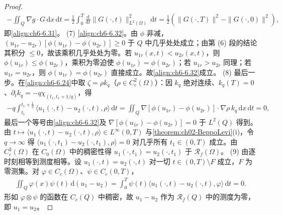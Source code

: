 \documentclass[../../main.tex]{subfiles}%
\begin{document}
\begin{proof}
\begin{align*}
-\iint_Q\nabla g\cdot G\,\mathrm{d}x\,\mathrm{d}t=\frac{1}{2}\int_0^T\frac{\mathrm{d}}{\mathrm{d}t}\|G(\cdot,t)\|_{L^2(\Omega)}^2\,\mathrm{d}t
=\frac{1}{2}\left(\|G(\cdot,T)\|^2-\|G(\cdot,0)\|^2\right),
\end{align*}
即\eqref{align:ch6-6.31}。
(7) \eqref{align:ch6-6.32}。由 $\phi$ 非减，$(u_{1r}-u_{2r})[\phi(u_{1r})-\phi(u_{2r})]\geqslant0$ 于 $Q$ 中几乎处处成立；由第 (6) 段的结论其积分 $\leqslant0$，故该乘积几乎处处为零。若 $u_{1r}(x,t)<u_{2r}(x,t)$，则 $\phi(u_{1r})\leqslant\phi(u_{2r})$，乘积为零迫使 $\phi(u_{1r})=\phi(u_{2r})$；若 $u_{1r}>u_{2r}$ 同理；若 $u_{1r}=u_{2r}$，则 $\phi(u_{1r})=\phi(u_{2r})$ 直接成立。故\eqref{align:ch6-6.32}成立。
(8) 最后一步。在\eqref{align:ch6-6.24}中取 $\zeta=\rho k_q$（$\rho\in C^2_c(\Omega)$）：因 $k_q$ 绝对连续、$k_q(T)=0$、$\partial_tk_q=-q\chi_{(t_1,t_1+1/q)}$，得
\begin{align*}
-q\int_{t_1}^{t_1+\frac{1}{q}}\langle u_1(\cdot,t)-u_2(\cdot,t),\rho\rangle\,\mathrm{d}t
=\iint_Q\nabla[\phi(u_{1r})-\phi(u_{2r})]\cdot\nabla\rho\,k_q\,\mathrm{d}x\,\mathrm{d}t=0,
\end{align*}
最后一个等号由\eqref{align:ch6-6.32}及 $\nabla[\phi(u_{1r})-\phi(u_{2r})]=0$ 于 $L^2(Q)$ 得到。由 $t\mapsto\langle u_1(\cdot,t)-u_2(\cdot,t),\rho\rangle\in L^\infty(0,T)$ 与\cref{theorem:ch02-BeppoLevi}(i)，令 $q\to\infty$ 得 $\langle u_1(\cdot,t_1)-u_2(\cdot,t_1),\rho\rangle=0$ 对几乎所有 $t_1\in(0,T)$ 成立。由 $C^2_c(\Omega)$ 在 $C_0(\Omega)$ 中的稠密性得 $u_1(\cdot,t_1)=u_2(\cdot,t_1)$ 于 $\mathscr{R}_f(\Omega)$。
(9) 由逐时刻相等到测度相等。设 $u_1(\cdot,t)=u_2(\cdot,t)$ 对一切 $t\in(0,T)\setminus F$ 成立，$F$ 为零测集。对 $\varphi\in C_c(\Omega)$、$\psi\in C_c(0,T)$，
\begin{align*}
\iint_Q\varphi(x)\psi(t)\,\mathrm{d}(u_1-u_2)
=\int_0^T\psi(t)\langle u_1(\cdot,t)-u_2(\cdot,t),\varphi\rangle\,\mathrm{d}t=0 .
\end{align*}
形如 $\varphi\otimes\psi$ 的函数在 $C_c(Q)$ 中稠密，故 $u_1-u_2$ 作为 $\mathscr{R}_f(Q)$ 中的测度为零，即 $u_1=u_2$。
\end{proof}
\end{document}
